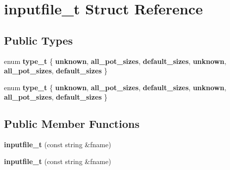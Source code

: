 \hypertarget{structinputfile__t}{}\section{inputfile\+\_\+t Struct Reference}
\label{structinputfile__t}
\subsection*{Public Types}
\begin{DoxyCompactItemize}
\item 
\mbox{\label{structinputfile__t_a5f7062d68daf3cd64502039d6c57d5f3}} 
enum {\bfseries type\+\_\+t} \{ \newline
{\bfseries unknown}, 
{\bfseries all\+\_\+pot\+\_\+sizes}, 
{\bfseries default\+\_\+sizes}, 
{\bfseries unknown}, 
\newline
{\bfseries all\+\_\+pot\+\_\+sizes}, 
{\bfseries default\+\_\+sizes}
 \}
\item 
\mbox{\label{structinputfile__t_a5f7062d68daf3cd64502039d6c57d5f3}} 
enum {\bfseries type\+\_\+t} \{ \newline
{\bfseries unknown}, 
{\bfseries all\+\_\+pot\+\_\+sizes}, 
{\bfseries default\+\_\+sizes}, 
{\bfseries unknown}, 
\newline
{\bfseries all\+\_\+pot\+\_\+sizes}, 
{\bfseries default\+\_\+sizes}
 \}
\end{DoxyCompactItemize}
\subsection*{Public Member Functions}
\begin{DoxyCompactItemize}
\item 
\mbox{\label{structinputfile__t_a9de56f8e060e4c74a506d1a244389a4a}} 
{\bfseries inputfile\+\_\+t} (const string \&fname)
\item 
\mbox{\label{structinputfile__t_a9de56f8e060e4c74a506d1a244389a4a}} 
{\bfseries inputfile\+\_\+t} (const string \&fname)
\end{DoxyCompactItemize}
